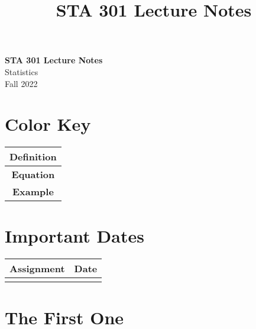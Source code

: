 \documentclass[11pt]{lectures}
\begin{document}
\title{STA 301 Lecture Notes}
\begin{center}
{\LARGE \bf STA 301 Lecture Notes}\\
{\large Statistics}\\
Fall 2022
\end{center}
\begin{multicols}{2}
\section*{Color Key}
\begin{tabular}{|c|}
    \hline
     \colorbox{defn}{\textbf{Definition}}\\
     \hline
     \colorbox{eqn}{\textbf{Equation}}\\
     \hline
     \colorbox{exam}{\textbf{Example}}\\
     \hline
\end{tabular}

\section*{Important Dates}
\begin{tabular}{|c|c|}
    \hline
    \textbf{Assignment} & \textbf{Date} \\
    \hline
    \hline
     & 
\end{tabular}
\end{multicols}
\setcounter{section}{0}

\section{The First One}
\end{document}

